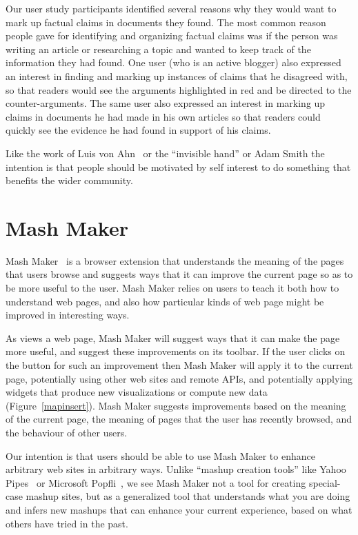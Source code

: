 \documentclass{chi2009}
\begin{document}
Our user study participants identified several reasons why they would want to mark up factual claims in documents they found. The most common reason people gave for identifying and organizing factual claims was if the person was writing an article or researching a topic and wanted to keep track of the information they had found. One user (who is an active blogger) also expressed an interest in finding and marking up instances of claims that he disagreed with, so that readers would see the arguments highlighted in red and be directed to the counter-arguments. The same user also expressed an interest in marking up claims in documents he had made in his own articles so that readers could quickly see the evidence he had found in support of his claims. 

Like the work of Luis von Ahn~\cite{vonahn,recaptcha} or the ``invisible hand'' or Adam Smith the intention is that people should be motivated by self interest to do something that benefits the wider community.



\section{Mash Maker}

Mash Maker~\cite{mashmaker} is a browser extension that understands the meaning of the pages that users browse and suggests ways that it can improve the current page so as to be more useful to the user. Mash Maker relies on users to teach it both how to understand web pages, and also how particular kinds of web page might be improved in interesting ways.

As views a web page, Mash Maker will suggest ways that it can make the page more useful, and suggest these improvements on its toolbar. If the user clicks on the button for such an improvement then Mash Maker will apply it to the current page, potentially using other web sites and remote APIs, and potentially applying widgets that produce new visualizations or compute new data (Figure~\ref{mapinsert}). Mash Maker suggests improvements based on the meaning of the current page, the meaning of pages that the user has recently browsed, and the behaviour of other users.

Our intention is that users should be able to use Mash Maker to enhance arbitrary web sites in arbitrary ways. Unlike ``mashup creation tools'' like Yahoo Pipes~\cite{pipes} or Microsoft Popfli~\cite{popfly}, we see Mash Maker not a tool for creating special-case mashup sites, but as a generalized tool that understands what you are doing and infers new mashups that can enhance your current experience, based on what others have tried in the past. 
\end{document}
